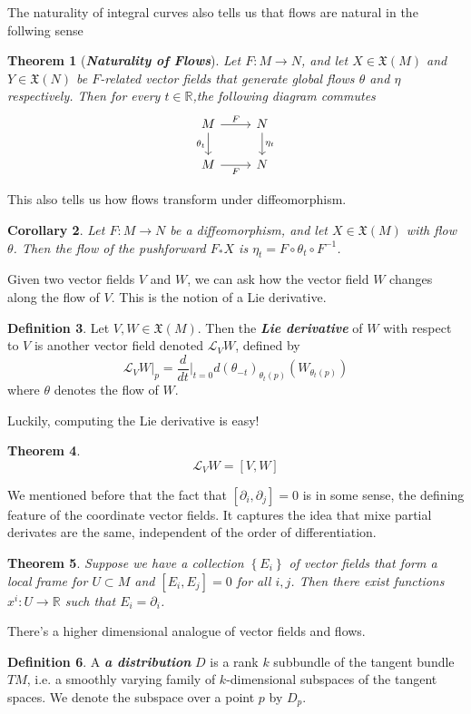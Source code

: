 \documentclass[psamsfonts]{amsart}
\newtheorem{thm}{Theorem}[section]
\newtheorem{cor}[thm]{Corollary}
\theoremstyle{definition}
\newtheorem{defn}[thm]{Definition}
\theoremstyle{remark}
\newcommand{\R}{\mathbb{R}}
\newcommand{\ib}[1]{\textbf{\textit{#1}}}
\newcommand{\inv}{^{-1}}
\newcommand{\set}[1]{\left\lbrace #1 \right\rbrace}
\begin{document}
The naturality of integral curves also tells us that flows are natural in the
follwing sense
%
\begin{thm}[\ib{Naturality of Flows}]
Let $F : M \to N$, and let $X \in \mathfrak{X}(M)$ and $Y \in \mathfrak{X}(N)$
be $F$-related vector fields that generate global flows $\theta$ and $\eta$
respectively. Then for every $t \in \R$,the following diagram commutes
%
\[\begin{tikzcd}
M \ar[r, "F"] \ar[d, "\theta_t"']& N \ar[d, "\eta_t"]\\
M \ar[r, "F"'] & N
\end{tikzcd}\]
%
\end{thm}
%
This also tells us how flows transform under diffeomorphism.
%
\begin{cor}
Let $F : M \to N$ be a diffeomorphism, and let $X \in \mathfrak{X}(M)$ with
flow $\theta$. Then the flow of the pushforward $F_*X$ is
$\eta_t = F \circ \theta_t \circ F\inv$.
\end{cor}
%
Given two vector fields $V$ and $W$, we can ask how the vector field $W$ changes
along the flow of $V$. This is the notion of a Lie derivative.
%
\begin{defn}
Let $V,W \in \mathfrak{X}(M)$. Then the \ib{Lie derivative} of $W$ with respect
to $V$ is another vector field denoted $\mathcal{L}_VW$, defined by
\[
\mathcal{L}_VW\vert_p = \frac{d}{dt}\bigg\vert_{t = 0}
d(\theta_{-t})_{\theta_t(p)}(W_{\theta_t(p)})
\]
where $\theta$ denotes the flow of $W$.
\end{defn}
%
Luckily, computing the Lie derivative is easy!
%
\begin{thm}
\[
\mathcal{L}_VW = [V,W]
\]
\end{thm}
%
We mentioned before that the fact that $[\partial_i, \partial_j] = 0$ is in some
sense, the defining feature of the coordinate vector fields. It captures the
idea that mixe partial derivates are the same, independent of the order of
differentiation.
%
\begin{thm}
Suppose we have a collection $\set{E_i}$ of vector fields that form a local
frame for $U \subset M$ and $[E_i,E_j] = 0$ for all $i,j$. Then there exist
functions $x^i : U \to \R$ such that $E_i = \partial_i$.
\end{thm}
%
There's a higher dimensional analogue of vector fields and flows.
%
\begin{defn}
A \ib{a distribution} $D$ is a rank $k$ subbundle of the tangent bundle $TM$, i.e.
a smoothly varying family of $k$-dimensional subspaces of the tangent spaces.
We denote the subspace over a point $p$ by $D_p$.
\end{defn}
\end{document}
